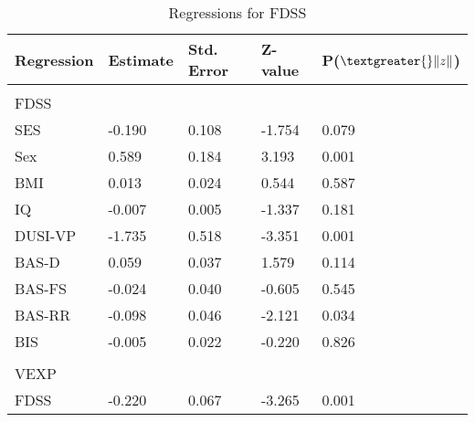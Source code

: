 \documentclass[utf8]{article}
\begin{document}
\begin{table}[]
\begin{tabular}{lllll}
Regression & Estimate & Std. Error & Z-value & P($\textgreater{}\|z\|$) \\ \hline
           &          &            &         &                          \\
FDSS       &          &            &         &                          \\
SES        & -0.190   & 0.108      & -1.754  & 0.079                    \\
Sex        & 0.589    & 0.184      & 3.193   & 0.001                    \\
BMI        & 0.013    & 0.024      & 0.544   & 0.587                    \\
IQ         & -0.007   & 0.005      & -1.337  & 0.181                    \\
DUSI-VP    & -1.735   & 0.518      & -3.351  & 0.001                    \\
BAS-D      & 0.059    & 0.037      & 1.579   & 0.114                    \\
BAS-FS     & -0.024   & 0.040      & -0.605  & 0.545                    \\
BAS-RR     & -0.098   & 0.046      & -2.121  & 0.034                    \\
BIS        & -0.005   & 0.022      & -0.220  & 0.826                    \\
           &          &            &         &                          \\
VEXP       &          &            &         &                          \\
FDSS       & -0.220   & 0.067      & -3.265  & 0.001                   
\end{tabular}
\caption{Regressions for FDSS\label{tab:6}}
\end{table}
\end{document}
